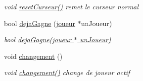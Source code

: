 \begin{DoxyCompactItemize}
\begin{DoxyCompactList}\small\item\em void \hyperlink{classMainWindow_a3ab75adb0221eb5e362f2070f71ebc22}{reset\-Curseur()}  remet le curseur normal \end{DoxyCompactList}\item 
bool \hyperlink{classMainWindow_a1810f8a7d5a8497d738d909efca8947b}{deja\-Gagne} (\hyperlink{classjoueur}{joueur} $\ast$un\-Joueur)
\begin{DoxyCompactList}\small\item\em bool \hyperlink{classMainWindow_a1810f8a7d5a8497d738d909efca8947b}{deja\-Gagne(joueur $\ast$ un\-Joueur)} \end{DoxyCompactList}\item 
\hypertarget{classMainWindow_a3c0bedf7eae76f0c5ca35bd16491b919}{void \hyperlink{classMainWindow_a3c0bedf7eae76f0c5ca35bd16491b919}{changement} ()}\label{classMainWindow_a3c0bedf7eae76f0c5ca35bd16491b919}

\begin{DoxyCompactList}\small\item\em void \hyperlink{classMainWindow_a3c0bedf7eae76f0c5ca35bd16491b919}{changement()}  change de joueur actif \end{DoxyCompactList}\end{DoxyCompactItemize}
